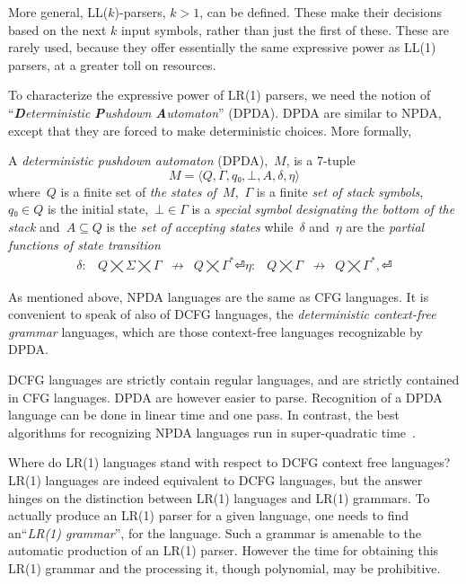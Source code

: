 More general, LL($k$)-parsers, $k>1$, can be defined. These make their
  decisions based on the next $k$ input symbols, rather than just the first of these.
These are rarely used, because they offer essentially the same expressive power as 
  LL(1) parsers, at a greater toll on resources. 

To characterize the expressive power of LR(1) parsers, we need the notion 
of ``\emph{\textbf Deterministic \textbf Pushdown \textbf Automaton}'' (DPDA). 
DPDA are similar to NPDA, except that they are forced 
  to make deterministic choices.
More formally, 
\begin{Definition}
  \label{Definition:DPDA}
  A \emph{deterministic pushdown automaton} (DPDA),~$M$, is a 7-tuple
  \[
    M =⟨Q,Γ, q₀,⊥, A,δ,η⟩
  \]
  where~$Q$ is a finite set of
  \emph{the states of~$M$},~$Γ$ is a finite
  \emph{set of stack symbols},~$q₀∈Q$ is the initial state,~$⊥∈Γ$
  is a \emph{special symbol designating the bottom of the stack}
  and~$A⊆Q$ is the \emph{set of accepting states} while~$δ$ and~$η$ are
  the \emph{partial functions of state transition}
  \[
    \begin{array}{crlc}
      δ: & Q⨉Σ⨉Γ &↛& Q⨉Γ^*⏎
      η: & Q⨉Γ &↛& Q⨉Γ^*,⏎
    \end{array}
  \]
\end{Definition}

As mentioned above, NPDA languages are the same as CFG languages.
It is convenient to speak of also of DCFG languages, the \emph{deterministic context-free grammar} languages, 
  which are those context-free languages recognizable by DPDA.
  
DCFG languages are strictly contain regular languages, and are strictly contained
  in CFG languages.
DPDA are however easier to parse. Recognition of a DPDA language 
  can be done in linear time and one pass.
  In contrast, the best algorithms for recognizing NPDA languages run in super-quadratic time~\cite{CYK,I forget the nnames}. 

Where do LR(1) languages stand with respect to DCFG context free languages? 
LR(1) languages are indeed equivalent to DCFG languages, but 
the answer hinges on the distinction 
  between LR(1) languages and LR(1) grammars. 
To actually produce an LR(1) parser for a given language, 
  one needs to find an``\emph{LR(1) grammar}'', for the language.
Such a grammar is amenable to 
  the automatic production of an LR(1) parser.
However the time for obtaining this LR(1) grammar and the processing it, 
  though polynomial, may be prohibitive. 

